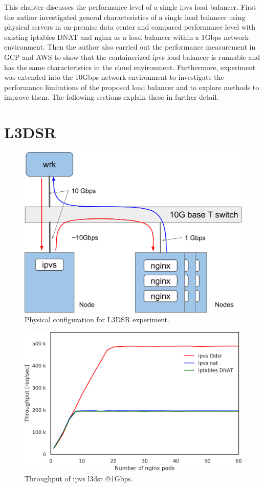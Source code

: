 This chapter discusses the performance level of a single ipvs load balancer.
First the author investigated general characteristics of a single load balancer using physical servers in on-premise data center and compared performance level with existing iptables DNAT and nginx as a load balancer within a 1Gbps network environment.
Then the author also carried out the performance measurement in GCP and AWS to show that the containerized ipvs load balancer is runnable and has the same characteristics in the cloud environment.
Furthermore, experiment was extended into the 10Gbps network environment to investigate the performance limitations of the proposed load balancer and to explore methods to improve them.
The following sections explain these in further detail.

\section{L3DSR}

\begin{figure}[h]
  \centering
  \includegraphics[width=0.8\columnwidth]{Figs/bench_10g_l3dsr}
  \caption{Physical configuration for L3DSR experiment.}
  \label{fig:bench_10g_l3dsr}
\end{figure}

\begin{figure}[h]
  \centering
  \includegraphics[width=0.8\columnwidth]{Figs/ipvs_l3dsr_1g.png}
  \caption{Throughput of ipvs l3dsr @1Gbps.}
  \label{fig:ipvs_l3dsr_1g.png}
\end{figure}

